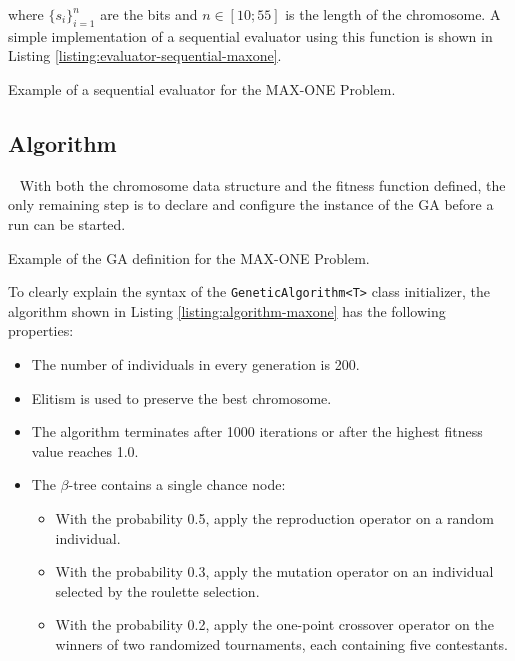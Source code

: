 \noindent
where $\{s_i\}_{i=1}^{n}$ are the bits and $n\in[10;55]$ is the length of the chromosome. A simple implementation of a sequential evaluator using this function is shown in Listing \ref{listing:evaluator-sequential-maxone}.

\begin{listing}[ht]
	\caption{Example of a sequential evaluator for the MAX-ONE Problem.}
	\label{listing:evaluator-sequential-maxone}
\end{listing}

\subsection{Algorithm}~\label{section:maxone-algorithm}
With both the chromosome data structure and the fitness function defined, the only remaining step is to declare and configure the instance of the GA before a run can be started. 

\begin{listing}[ht]
	\caption{Example of the GA definition for the MAX-ONE Problem.}
	\label{listing:algorithm-maxone}
\end{listing}

To clearly explain the syntax of the \texttt{GeneticAlgorithm<T>} class initializer, the algorithm shown in Listing \ref{listing:algorithm-maxone} has the following properties:
~
\begin{itemize}
	\item The number of individuals in every generation is 200.
	\item Elitism is used to preserve the best chromosome.
	\item The algorithm terminates after 1000 iterations or after the highest fitness value reaches 1.0.
	\item The $\beta$-tree contains a single chance node:
	~
	\begin{itemize}
		\item With the probability 0.5, apply the reproduction operator on a random individual.
		\item With the probability 0.3, apply the mutation operator on an individual selected by the roulette selection.
		\item With the probability 0.2, apply the one-point crossover operator on the winners of two randomized tournaments, each containing five contestants.
	\end{itemize}
\end{itemize}

